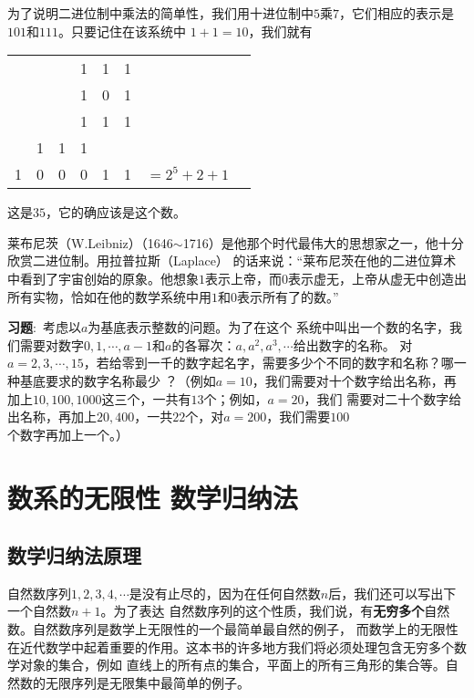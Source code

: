 为了说明二进位制中乘法的简单性，我们用十进位制中$5$乘$7$，它们相应的表示是$101$和$111$。只要记住在该系统中
$1+1=10$，我们就有
\begin{center}
\begin{tabular}{ccccccccc}
  &  &  & 1 & 1 & 1 &  &  &   \\
  &  &  & 1 & 0 & 1 &  &  &   \\
\cline{1-7}
  &  &  & 1 & 1 & 1 &  &  &   \\
  & 1 & 1 & 1 &  &  &  &  &   \\
\cline{1-7}
 1& 0 & 0 & 0 & 1 & 1 &  \multicolumn{2}{c}{$=2^5+2+1$}  
\end{tabular}
\end{center}
这是$35$，它的确应该是这个数。

莱布尼茨（W.Leibniz）（1646$\sim$1716）是他那个时代最伟大的思想家之一，他十分欣赏二进位制。用拉普拉斯（Laplace）
的话来说：“莱布尼茨在他的二进位算术中看到了宇宙创始的原象。他想象$1$表示上帝，而$0$表示虚无，上帝从虚无中创造出
所有实物，恰如在他的数学系统中用$1$和$0$表示所有了的数。”
\begin{spacing}{2.0}
\end{spacing}

\setlength{\hangindent}{2em}
\qquad \textbf{习题}:\, {\footnotesize 考虑以$a$为基底表示整数的问题。为了在这个
系统中叫出一个数的名字，我们需要对数字$0,1,\cdots,a-1$和$a$的各幂次：$a,a^2,a^3,\cdots$给出数字的名称。
对$a=2,3,\cdots,15$，若给零到一千的数字起名字，需要多少个不同的数字和名称？哪一种基底要求的数字名称最少
？（例如$a=10$，我们需要对十个数字给出名称，再加上$10,100,1000$这三个，一共有$13$个；例如，$a=20$，我们
需要对二十个数字给出名称，再加上$20,400$，一共$22$个，对$a=200$，我们需要$100$个数字再加上一个。）}

\section{数系的无限性 \hspace{1em} 数学归纳法}
\subsection{数学归纳法原理}
自然数序列$1,2,3,4,\cdots$是没有止尽的，因为在任何自然数$n$后，我们还可以写出下一个自然数$n+1$。为了表达
自然数序列的这个性质，我们说，有\textbf{无穷多个}自然数。自然数序列是数学上无限性的一个最简单最自然的例子，
而数学上的无限性在近代数学中起着重要的作用。这本书的许多地方我们将必须处理包含无穷多个数学对象的集合，例如
直线上的所有点的集合，平面上的所有三角形的集合等。自然数的无限序列是无限集中最简单的例子。


